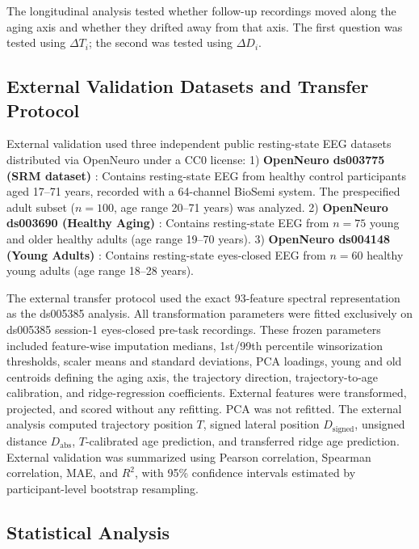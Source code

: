 \documentclass[journal]{IEEEtran}
\begin{document}
The longitudinal analysis tested whether follow-up recordings moved along the aging axis and whether they drifted away from that axis. The first question was tested using $\Delta T_i$; the second was tested using $\Delta D_i$.

\subsection{External Validation Datasets and Transfer Protocol}

External validation used three independent public resting-state EEG datasets distributed via OpenNeuro under a CC0 license:
1) \textbf{OpenNeuro ds003775 (SRM dataset)} \cite{openneuro_ds003775,hatlestad2022bids}: Contains resting-state EEG from healthy control participants aged 17--71 years, recorded with a 64-channel BioSemi system. The prespecified adult subset ($n=100$, age range 20--71 years) was analyzed.
2) \textbf{OpenNeuro ds003690 (Healthy Aging)} \cite{openneuro_ds003690}: Contains resting-state EEG from $n=75$ young and older healthy adults (age range 19--70 years).
3) \textbf{OpenNeuro ds004148 (Young Adults)} \cite{openneuro_ds004148}: Contains resting-state eyes-closed EEG from $n=60$ healthy young adults (age range 18--28 years).

The external transfer protocol used the exact 93-feature spectral representation as the ds005385 analysis. All transformation parameters were fitted exclusively on ds005385 session-1 eyes-closed pre-task recordings. These frozen parameters included feature-wise imputation medians, 1st/99th percentile winsorization thresholds, scaler means and standard deviations, PCA loadings, young and old centroids defining the aging axis, the trajectory direction, trajectory-to-age calibration, and ridge-regression coefficients. External features were transformed, projected, and scored without any refitting. PCA was not refitted. The external analysis computed trajectory position $T$, signed lateral position $D_{\mathrm{signed}}$, unsigned distance $D_{\mathrm{abs}}$, $T$-calibrated age prediction, and transferred ridge age prediction. External validation was summarized using Pearson correlation, Spearman correlation, MAE, and $R^2$, with 95\% confidence intervals estimated by participant-level bootstrap resampling.



\subsection{Statistical Analysis}
\end{document}
